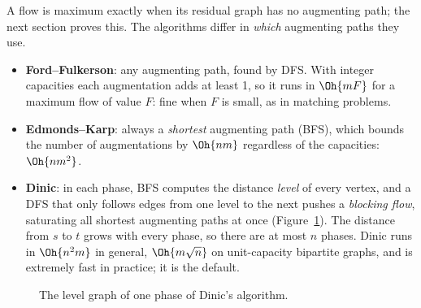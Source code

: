 A flow is maximum exactly when its residual graph has no augmenting path; the next section proves this. The algorithms differ in
\emph{which} augmenting paths they use.

\begin{itemize}
  \item \textbf{Ford--Fulkerson}: any augmenting path, found by DFS. With integer capacities each augmentation adds at least 1,
        so it runs in $\Oh{m F}$ for a maximum flow of value $F$: fine when $F$ is small, as in matching problems.
  \item \textbf{Edmonds--Karp}: always a \emph{shortest} augmenting path (BFS), which bounds the number of augmentations by
        $\Oh{nm}$ regardless of the capacities: $\Oh{nm^2}$.
  \item \textbf{Dinic}: in each phase, BFS computes the distance \emph{level} of every vertex, and a DFS that only follows edges
        from one level to the next pushes a \emph{blocking flow}, saturating all shortest augmenting paths at once
        (Figure~\ref{fig:dinic}). The distance from $s$ to $t$ grows with every phase, so there are at most $n$ phases.
        Dinic runs in $\Oh{n^2 m}$ in general, $\Oh{m\sqrt n}$ on unit-capacity bipartite graphs, and is extremely fast in
        practice; it is the default.
\end{itemize}

\begin{figure}[htbp]
\centering
{}
\caption{The level graph of one phase of Dinic's algorithm.}
\label{fig:dinic}
\end{figure}

